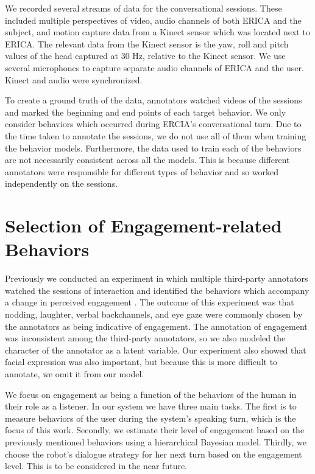 \documentclass[letterpaper]{article} %
\begin{document}
We recorded several streams of data for the conversational sessions. These included multiple perspectives of video, audio channels of both ERICA and the subject, and motion capture data from a Kinect sensor which was located next to ERICA. The relevant data from the Kinect sensor is the yaw, roll and pitch values of the head captured at 30 Hz, relative to the Kinect sensor. We use several microphones to capture separate audio channels of ERICA and the user. Kinect and audio were synchronized.

To create a ground truth of the data, annotators watched videos of the sessions and marked the beginning and end points of each target behavior. We only consider behaviors which occurred during ERCIA's conversational turn. Due to the time taken to annotate the sessions, we do not use all of them when training the behavior models. Furthermore, the data used to train each of the behaviors are not necessarily consistent across all the models. This is because different annotators were responsible for different types of behavior and so worked independently on the sessions.

\section{Selection of Engagement-related Behaviors} \label{engagementsection}
Previously we conducted an experiment in which multiple third-party annotators watched the sessions of interaction and identified the behaviors which accompany a change in perceived engagement \cite{Inoue2016}. The outcome of this experiment was that nodding, laughter, verbal backchannels, and eye gaze were commonly chosen by the annotators as being indicative of engagement. The annotation of engagement was inconsistent among the third-party annotators, so we also modeled the character of the annotator as a latent variable. Our experiment also showed that facial expression was also important, but because this is more difficult to annotate, we omit it from our model.

We focus on engagement as being a function of the behaviors of the human in their role as a listener. In our system we have three main tasks. The first is to measure behaviors of the user during the system's speaking turn, which is the focus of this work. Secondly, we estimate their level of engagement based on the previously mentioned behaviors using a hierarchical Bayesian model. Thirdly, we choose the robot's dialogue strategy for her next turn based on the engagement level. This is to be considered in the near future.
\end{document}
